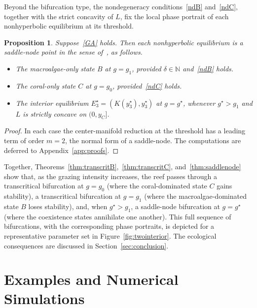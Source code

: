 \documentclass[reqno,11pt]{amsart}
\newtheorem{prop}[thm]{Proposition}
\numberwithin{equation}{section}
\newcommand{\N}{\mathbb{N}}
\begin{document}
Beyond the bifurcation type, the nondegeneracy conditions~\eqref{ndB} and~\eqref{ndC}, together with the strict concavity of $L$, fix the local phase portrait of each nonhyperbolic equilibrium at its threshold.

\begin{prop}\label{prop:sn}
Suppose~\eqref{GA} holds. Then each nonhyperbolic equilibrium is a saddle-node point in the sense of~\cite[Sec.~2.11]{Pe01}, as follows.
\begin{itemize}
\item[\textup{(i)}] The macroalgae-only state $B$ at $g=g_1$, provided $\delta\in\N$ and~\eqref{ndB} holds.
\item[\textup{(ii)}] The coral-only state $C$ at $g=g_0$, provided~\eqref{ndC} holds.
\item[\textup{(iii)}] The interior equilibrium $E_3^\star=(K(y_3^\star),y_3^\star)$ at $g=g^\star$, whenever $g^\star>g_1$ and $L$ is strictly concave on $(0,y_C]$.
\end{itemize}
\end{prop}

\begin{proof}
In each case the center-manifold reduction at the threshold has a leading term of order $m=2$, the normal form of a saddle-node. The computations are deferred to Appendix~\ref{app:proofs}.
\end{proof}

Together, Theorems~\ref{thm:transcritB},~\ref{thm:transcritC}, and~\ref{thm:saddlenode} show that, as the grazing intensity increases, the reef passes through a transcritical bifurcation at $g=g_0$ (where the coral-dominated state $C$ gains stability), a transcritical bifurcation at $g=g_1$ (where the macroalgae-dominated state $B$ loses stability), and, when $g^\star>g_1$, a saddle-node bifurcation at $g=g^\star$ (where the coexistence states annihilate one another). This full sequence of bifurcations, with the corresponding phase portraits, is depicted for a representative parameter set in Figure~\ref{fig:twointerior}. The ecological consequences are discussed in Section~\ref{sec:conclusion}.

\bigskip

\section{Examples and Numerical Simulations}\label{sec:exnum} 
\end{document}
